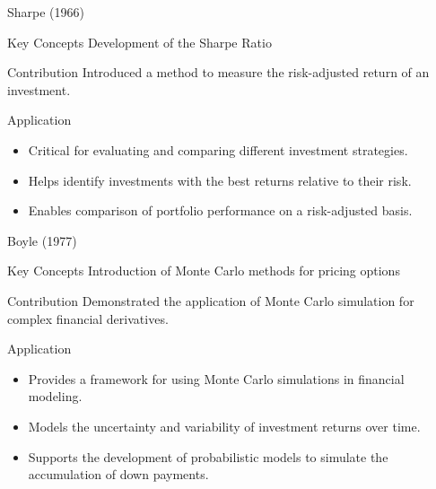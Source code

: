\documentclass{beamer}
\begin{document}
\begin{frame}{Sharpe (1966)}
    \begin{block}{Key Concepts}
        Development of the Sharpe Ratio
    \end{block}
    \begin{block}{Contribution}
        Introduced a method to measure the risk-adjusted return of an investment.
    \end{block}
    \begin{block}{Application}
        \begin{itemize}
            \item Critical for evaluating and comparing different investment strategies.
            \item Helps identify investments with the best returns relative to their risk.
            \item Enables comparison of portfolio performance on a risk-adjusted basis.
        \end{itemize}
    \end{block}
\end{frame}


\begin{frame}{Boyle (1977)}
    \begin{block}{Key Concepts}
        Introduction of Monte Carlo methods for pricing options
    \end{block}
    \begin{block}{Contribution}
        Demonstrated the application of Monte Carlo simulation for complex financial derivatives.
    \end{block}
    \begin{block}{Application}
        \begin{itemize}
            \item Provides a framework for using Monte Carlo simulations in financial modeling.
            \item Models the uncertainty and variability of investment returns over time.
            \item Supports the development of probabilistic models to simulate the accumulation of down payments.
        \end{itemize}
    \end{block}
\end{frame}
\end{document}
